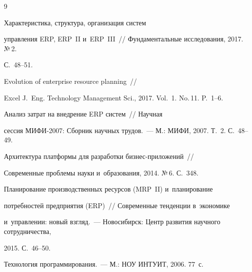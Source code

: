 {\small\frenchspacing

{%


\begin{thebibliography}{9}


 Характеристика, структура, организация систем 

управ\-ле\-ния ERP, ERP~II и~ERP~III~/\!\!/ Фундаментальные исследования, 2017. №\,2. 

С.~48--51.


 Evolution of enterprise resource planning~/\!\!/ 

Excel J.~Eng. Technology Management Sci., 2017. Vol.~1. No.\,11. P.~1--6.


 Анализ затрат на внедрение ERP систем~/\!\!/ Научная 

сессия МИФИ-2007: Сборник научных трудов.~--- М.: МИФИ, 2007. Т.~2. С.~48--49.


 Архитектура платформы для разработки биз\-нес-при\-ло\-же\-ний~/\!\!/ 

Современные проблемы науки и~образования, 2014. №\,6. С.~348.


 Планирование производственных ресурсов (MRP~II) и~планирование 

потребностей предприятия (ERP)~/\!\!/ Современные тенденции в~экономике 

и~управ\-ле\-нии: новый взгляд.~--- Новосибирск: Центр развития научного сотрудничества, 

2015. С.~46--50.


 Технология программирования.~--- М.: НОУ ИНТУИТ, 2006. 77~с.

        \end{thebibliography}

} }





\vspace*{-3pt}



